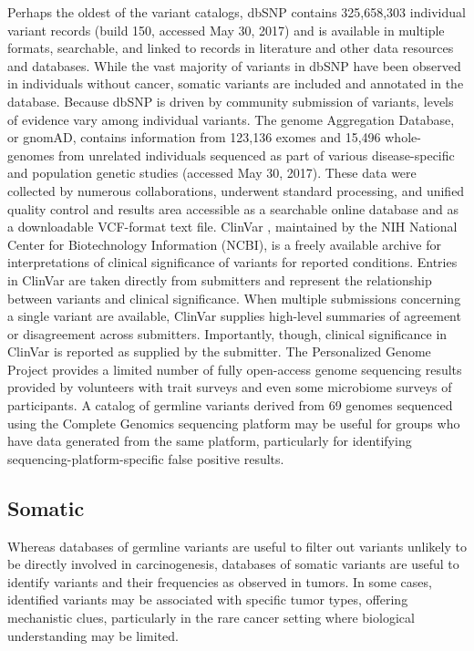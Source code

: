 \documentclass[10pt,letterpaper]{article}
\begin{document}
Perhaps the oldest of the variant catalogs, dbSNP contains 325,658,303
individual variant records (build 150, accessed May 30, 2017) and is
available in multiple formats, searchable, and linked to records in
literature and other data resources and databases. While the vast
majority of variants in dbSNP have been observed in individuals
without cancer, somatic variants are included and annotated in the
database. Because dbSNP is driven by community submission of variants,
levels of evidence vary among individual variants. The genome
Aggregation Database, or gnomAD, \cite{Lek2016-bb,noauthor_undated-of}
contains information from 123,136 exomes and 15,496 whole-genomes from
unrelated individuals sequenced as part of various disease-specific
and population genetic studies (accessed May 30, 2017). These data
were collected by numerous collaborations, underwent standard
processing, and unified quality control and results area accessible as
a searchable online database and as a downloadable VCF-format text
file. ClinVar \cite{Landrum2016-ul}, maintained by the NIH National
Center for Biotechnology Information (NCBI), is a freely available
archive for interpretations of clinical significance of variants for
reported conditions. Entries in ClinVar are taken directly from
submitters and represent the relationship between variants and
clinical significance. When multiple submissions concerning a single
variant are available, ClinVar supplies high-level summaries of
agreement or disagreement across submitters. Importantly, though,
clinical significance in ClinVar is reported as supplied by the
submitter. The Personalized Genome Project \cite{Church2005-lr}
provides a limited number of fully open-access genome sequencing
results provided by volunteers with trait surveys and even some
microbiome surveys of participants. A catalog of germline variants
derived from 69 genomes sequenced using the Complete Genomics
sequencing platform \cite{Drmanac2010-od} may be useful for groups who
have data generated from the same platform, particularly for
identifying sequencing-platform-specific false positive results.

\subsection{Somatic}

Whereas databases of germline variants are useful to filter
out variants unlikely to be directly involved in carcinogenesis,
databases of somatic variants are useful to identify variants and
their frequencies as observed in tumors. In some cases, identified
variants may be associated with specific tumor types, offering
mechanistic clues, particularly in the rare cancer setting where
biological understanding may be limited.
\end{document}
